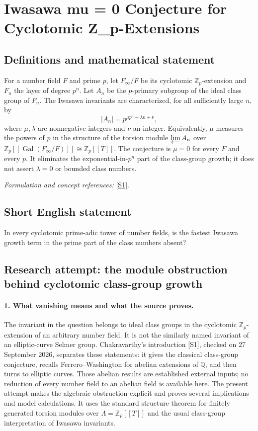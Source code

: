 \documentclass[11pt]{article}
\begin{document}
\section*{\texorpdfstring{Iwasawa mu = 0 Conjecture for Cyclotomic Z\_p-Extensions}{Iwasawa mu = 0 Conjecture for Cyclotomic Z\_p-Extensions}}\label{324}
\subsection{Definitions and mathematical statement}
For a number field $F$ and prime $p$, let $F_\infty/F$ be its cyclotomic ${\mathbb{Z}}_p$-extension and $F_n$ the layer of degree $p^n$. Let $A_n$ be the $p$-primary subgroup of the ideal class group of $F_n$. The Iwasawa invariants are characterized, for all sufficiently large $n$, by
\[
 |A_n|=p^{\mu p^n+\lambda n+\nu},
\]
where $\mu,\lambda$ are nonnegative integers and $\nu$ an integer. Equivalently, $\mu$ measures the powers of $p$ in the structure of the torsion module $\varprojlim A_n$ over ${\mathbb{Z}}_p[[\operatorname{Gal}(F_\infty/F)]]\cong{\mathbb{Z}}_p[[T]]$. The conjecture is $\mu=0$ for every $F$ and every $p$. It eliminates the exponential-in-$p^n$ part of the class-group growth; it does not assert $\lambda=0$ or bounded class numbers.
\par\smallskip\textit{Formulation and concept references:} \href{https://arxiv.org/html/2408.07826v2}{[S1]}.

\subsection{Short English statement}
In every cyclotomic prime-adic tower of number fields, is the fastest Iwasawa growth term in the prime part of the class numbers absent?
\subsection{Research attempt: the module obstruction behind cyclotomic class-group growth}
\paragraph{1. What vanishing means and what the source proves.}
The invariant in the question belongs to ideal class groups in the cyclotomic $\mathbb Z_p$-extension of an arbitrary number field. It is not the similarly named invariant of an elliptic-curve Selmer group. Chakravarthy's introduction [S1], checked on 27 September 2026, separates these statements: it gives the classical class-group conjecture, recalls Ferrero--Washington for abelian extensions of $\mathbb Q$, and then turns to elliptic curves. Those abelian results are established external inputs; no reduction of every number field to an abelian field is available here. The present attempt makes the algebraic obstruction explicit and proves several implications and model calculations. It uses the standard structure theorem for finitely generated torsion modules over $\Lambda=\mathbb Z_p[[T]]$ and the usual class-group interpretation of Iwasawa invariants.
\end{document}
